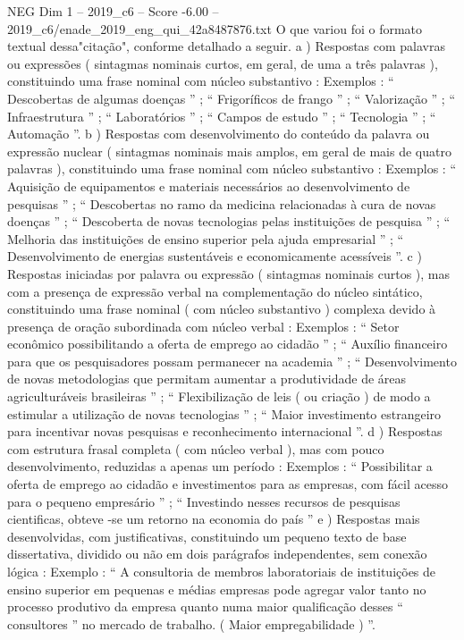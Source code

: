 \begin{textsample}{NEG Dim 1 – 2019\_c6 – Score -6.00 – 2019\_c6/enade\_2019\_eng\_qui\_42a8487876.txt}
O que variou foi o formato textual dessa"citação", conforme detalhado a seguir. a ) Respostas com palavras ou expressões ( sintagmas nominais curtos, em geral, de uma a três palavras ), constituindo uma frase nominal com núcleo substantivo : Exemplos : “ Descobertas de algumas doenças ” ; “ Frigoríficos de frango ” ; “ Valorização ” ; “ Infraestrutura ” ; “ Laboratórios ” ; “ Campos de estudo ” ; “ Tecnologia ” ; “ Automação ”. b ) Respostas com desenvolvimento do conteúdo da palavra ou expressão nuclear ( sintagmas nominais mais amplos, em geral de mais de quatro palavras ), constituindo uma frase nominal com núcleo substantivo : Exemplos : “ Aquisição de equipamentos e materiais necessários ao desenvolvimento de pesquisas ” ; “ Descobertas no ramo da medicina relacionadas à cura de novas doenças ” ; “ Descoberta de novas tecnologias pelas instituições de pesquisa ” ; “ Melhoria das instituições de ensino superior pela ajuda empresarial ” ; “ Desenvolvimento de energias sustentáveis e economicamente acessíveis ”. c ) Respostas iniciadas por palavra ou expressão ( sintagmas nominais curtos ), mas com a presença de expressão verbal na complementação do núcleo sintático, constituindo uma frase nominal ( com núcleo substantivo ) complexa devido à presença de oração subordinada com núcleo verbal : Exemplos : “ Setor econômico possibilitando a oferta de emprego ao cidadão ” ; “ Auxílio financeiro para que os pesquisadores possam permanecer na academia ” ; “ Desenvolvimento de novas metodologias que permitam aumentar a produtividade de áreas agriculturáveis brasileiras ” ; “ Flexibilização de leis ( ou criação ) de modo a estimular a utilização de novas tecnologias ” ; “ Maior investimento estrangeiro para incentivar novas pesquisas e reconhecimento internacional ”. d ) Respostas com estrutura frasal completa ( com núcleo verbal ), mas com pouco desenvolvimento, reduzidas a apenas um período : Exemplos : “ Possibilitar a oferta de emprego ao cidadão e investimentos para as empresas, com fácil acesso para o pequeno empresário ” ; “ Investindo nesses recursos de pesquisas cientificas, obteve -se um retorno na economia do país ” e ) Respostas mais desenvolvidas, com justificativas, constituindo um pequeno texto de base dissertativa, dividido ou não em dois parágrafos independentes, sem conexão lógica : Exemplo : “ A consultoria de membros laboratoriais de instituições de ensino superior em pequenas e médias empresas pode agregar valor tanto no processo produtivo da empresa quanto numa maior qualificação desses “ consultores ” no mercado de trabalho. ( Maior empregabilidade ) ”.

\end{textsample}
